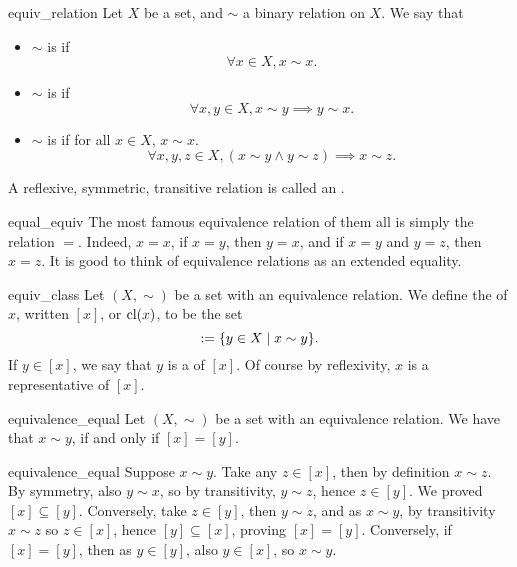 \begin{cdef}{}{equiv_relation}
    Let \( X \) be a set, and \( \sim \) a binary relation on \( X \). We say that
    \begin{itemize}
        \item \( \sim \) is  if 
        \begin{equation*}
            \forall x \in X, x \sim x.
        \end{equation*}
        \item \( \sim \) is  if
        \begin{equation*}
            \forall x, y \in X, x \sim y \implies y \sim x.
        \end{equation*}
        \item \( \sim \) is  if for all \( x \in X \), \( x \sim x \).
        \begin{equation*}
            \forall x, y, z \in X, (x \sim y \land y \sim z) \implies x \sim z.
        \end{equation*}
    \end{itemize}
    A reflexive, symmetric, transitive relation is called an . 
\end{cdef}

\begin{cexp}{}{equal_equiv}
    The most famous equivalence relation of them all is simply the relation \( = \). Indeed, \( x = x \), if \( x = y \), then \( y = x \), and if \( x = y \) and \( y = z \), then \( x = z \). It is good to think of equivalence relations as an extended equality.    
\end{cexp}

\begin{cdef}{}{equiv_class}
    Let \( (X, \sim) \) be a set with an equivalence relation. We define the  of \( x \), written \( [x] \), or \( \operatorname{cl}(x) \), to be the set
    \begin{equation*}
        [x] \defeq \{ y \in X \mid x \sim y \}.
    \end{equation*}
    If \( y \in [x] \), we say that \( y \) is a  of \( [x] \). Of course by reflexivity, \( x \) is a representative of \( [x] \).
\end{cdef}

\begin{clem}{}{equivalence_equal}
    Let \( (X, \sim) \) be a set with an equivalence relation. We have that \( x \sim y \), if and only if \( [x] = [y] \).
\end{clem}
\begin{lemproof}{equivalence_equal}
    Suppose \( x \sim y \). Take any \( z \in [x] \), then by definition \( x \sim z \). By symmetry, also \( y \sim x \), so by transitivity, \( y \sim z \), hence \( z \in [y] \). We proved \( [x] \subseteq [y] \). Conversely, take \( z \in [y] \), then \( y \sim z \), and as \( x \sim y \), by transitivity \( x \sim z \) so \( z \in [x] \), hence \( [y] \subseteq [x] \), proving \( [x] = [y] \). Conversely, if \( [x] = [y] \), then as \( y \in [y] \), also \( y \in [x] \), so \( x \sim y \). 
\end{lemproof}


